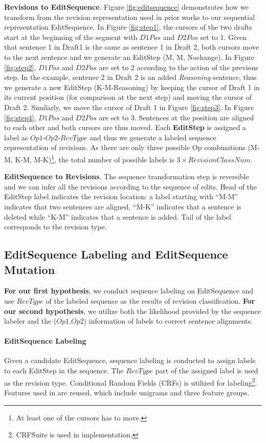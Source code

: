 \documentclass[11pt]{article}
\begin{document}
\textbf{Revisions to EditSequence}. Figure \ref{fig:editsequence} demonstrates how we transform from the revision representation used in prior works to our sequential representation EditSequence. In Figure \ref{fig:step1}, the cursors of the two drafts start at the beginning of the segment with $D1Pos$ and $D2Pos$ set to 1. Given that sentence 1 in Draft1 is the same as sentence 1 in Draft 2, both cursors move to the next sentence and we generate an EditStep (M, M, Nochange). In Figure \ref{fig:step2}, $D1Pos$ and $D2Pos$ are set to 2 according to the action of the previous step. In the example, sentence 2 in Draft 2 is an added \textit{Reasoning} sentence, thus we generate a new EditStep (K-M-Reasoning) by keeping the cursor of Draft 1 in its current position (for comparison at the next step) and moving the cursor of Draft 2. Similarly, we move the cursor of Draft 1 in Figure \ref{fig:step3}. In Figure \ref{fig:step4}, $D1Pos$ and $D2Pos$ are set to 3. Sentences at the position are aligned to each other and both cursors are thus moved. Each \textbf{EditStep} is assigned a label as $Op1$-$Op2$-$RevType$ and thus we generate a labeled sequence representation of revisions. As there are only three possible Op combinations (M-M, K-M, M-K)\footnote{At least one of the cursors has to move.}, the total number of possible labels is $3 \times RevisionClassNum$. 

\textbf{EditSequence to Revisions}. The sequence transformation step is reversible and we can infer all the revisions according to the sequence of edits. Head of the EditStep label indicates the revision location: a label starting with ``M-M'' indicates that two sentences are aligned, ``M-K'' indicates that a sentence is deleted while ``K-M'' indicates that a sentence is added. Tail of the label corresponds to the revision type.  


\subsection{EditSequence Labeling and EditSequence Mutation}
\textbf{For our first hypothesis}, we conduct sequence labeling on EditSequence and use $RevType$ of the labeled sequence as the results of revision classification. \textbf{For our second hypothesis}, we utilize both the likelihood provided by the sequence labeler and the ($Op1$,$Op2$) information of labels to correct sentence alignments.  

\paragraph{EditSequence Labeling}
Given a candidate EditSequence, sequence labeling is conducted to assign labels to each EditStep in the sequence. The $RevType$ part of the assigned label is used as the revision type. Conditional Random Fields  (CRFs) \cite{lafferty2001conditional} is utilized for labeling\footnote{CRFSuite \cite{CRFsuite} is used in implementation.}. Features used in \cite{zhang-litman:2015:bea} are reused, which include unigrams and three feature groups.
\end{document}
